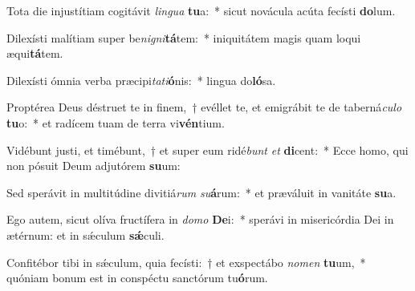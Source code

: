 \item Tota die injustítiam cogitávit \textit{lin}\textit{gua} \textbf{tu}a:~* sicut novácula acúta fecísti \textbf{do}lum.
\item Dilexísti malítiam super be\textit{ni}\textit{gni}\textbf{tá}tem:~* iniquitátem magis quam loqui æqui\textbf{tá}tem.
\item Dilexísti ómnia verba præcipi\textit{ta}\textit{ti}\textbf{ó}nis:~* lingua do\textbf{ló}sa.
\item Proptérea Deus déstruet te in finem,~† evéllet te, et emigrábit te de taberná\textit{cu}\textit{lo} \textbf{tu}o:~* et radícem tuam de terra vi\textbf{vén}tium.
\item Vidébunt justi, et timébunt,~† et super eum ridé\textit{bunt} \textit{et} \textbf{di}cent:~* Ecce homo, qui non pósuit Deum adjutórem \textbf{su}um:
\item Sed sperávit in multitúdine divitiá\textit{rum} \textit{su}\textbf{á}rum:~* et præváluit in vanitáte \textbf{su}a.
\item Ego autem, sicut olíva fructífera in \textit{do}\textit{mo} \textbf{De}i:~* sperávi in misericórdia Dei in ætérnum: et in sǽculum \textbf{sǽ}culi.
\item Confitébor tibi in sǽculum, quia fecísti:~† et exspectábo \textit{no}\textit{men} \textbf{tu}um,~* quóniam bonum est in conspéctu sanctórum tu\textbf{ó}rum.
